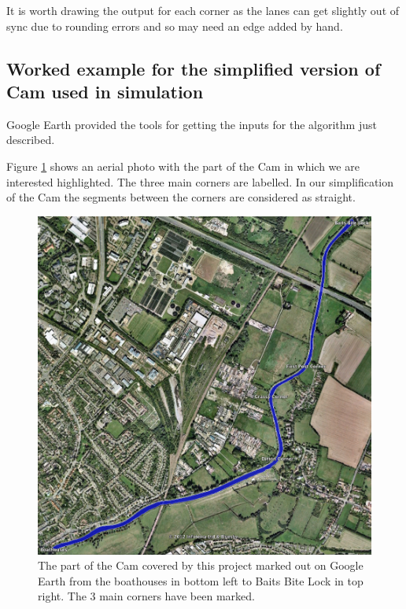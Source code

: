        It is worth drawing the output for each corner as the lanes can get slightly out of sync due to rounding errors and so may need an edge added by hand.
      
      \subsection{Worked example for the simplified version of Cam used in simulation}
      Google Earth provided the tools for getting the inputs for the algorithm just described.
      
      Figure \ref{techissues:fig:actualcam} shows an aerial photo with the part of the Cam in which we are interested highlighted. The three main corners are labelled. In our simplification of the Cam the segments between the corners are considered as straight.
      
      \begin{figure}
      \begin{center}
        \includegraphics[scale=0.45]{images/GoogleEarthCam.png}
        \caption{The part of the Cam covered by this project marked out on Google Earth from the boathouses in bottom left to Baits Bite Lock in top right. The 3 main corners have been marked.}
        \label{techissues:fig:actualcam}
      \end{center}
      \end{figure}
      
